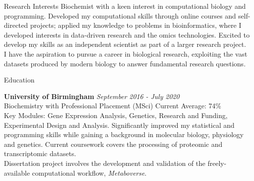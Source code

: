 \documentclass{resume}
\begin{document}
\begin{rSection}{Research Interests}
Biochemist with a keen interest in computational biology and programming. Developed my computational skills through online courses and self-directed projects; applied my knowledge to problems in bioinformatics, where I developed interests in data-driven research and the omics technologies. Excited to develop my skills as an independent scientist as part of a larger research project. I have the aspiration to pursue a career in biological research, exploiting the vast datasets produced by modern biology to answer fundamental research questions.
\end{rSection}
\begin{rSection}{Education}

{\bf University of Birmingham} \hfill {\em September 2016 - July 2020} 
\\ Biochemistry with Professional Placement (MSci) \hfill {Current Average: 74\%} \smallskip \\
Key Modules: Gene Expression Analysis, Genetics, Research and Funding, Experimental Design and Analysis. Significantly improved my statistical and programming skills while gaining a background in molecular biology, physiology and genetics. Current coursework covers the processing of proteomic and transcriptomic datasets. \smallskip \\ Dissertation project involves the development and validation of the freely-available computational workflow, \textit{Metaboverse}.  \\

\end{rSection}
\end{document}

